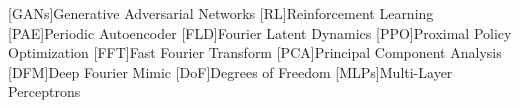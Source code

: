 \begin{acronym}
[GANs]{Generative Adversarial Networks}
[RL]{Reinforcement Learning}
[PAE]{Periodic Autoencoder}
[FLD]{Fourier Latent Dynamics}
[PPO]{Proximal Policy Optimization}
[FFT]{Fast Fourier Transform}
[PCA]{Principal Component Analysis}
[DFM]{Deep Fourier Mimic}
[DoF]{Degrees of Freedom}
[MLPs]{Multi-Layer Perceptrons}
\end{acronym}

